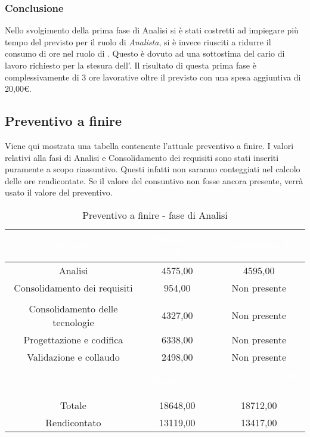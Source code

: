 \subsubsection{Conclusione}
Nello svolgimento della prima fase di Analisi si è stati costretti ad impiegare più tempo del previsto per il ruolo di \textit{Analista}, si è invece riusciti a ridurre il consumo di ore nel ruolo di \textit{\Amministratore}. Questo è dovuto ad una sottostima del cario di lavoro richiesto per la stesura dell'{\AdR}. Il risultato di questa prima fase è complessivamente di 3 ore lavorative oltre il previsto con una spesa aggiuntiva di 20,00€.
\subsection{Preventivo a finire}
Viene qui mostrata una tabella contenente l'attuale preventivo a finire. I valori relativi alla fasi di Analisi e Consolidamento dei requisiti sono stati inseriti puramente a scopo riassuntivo. Questi infatti non saranno conteggiati nel calcolo delle ore rendicontate. Se il valore del consuntivo non fosse ancora presente, verrà usato il valore del preventivo.
\begin{table}[H]
	\centering
	\begin{tabular}{|c|c|c|}
	\rowcolor{darkblue} 
		\textcolor{white}{Periodo}	&\textcolor{white}{Preventivo €}	&	\textcolor{white}{Consuntivo €} \\ \hline
		Analisi					&	4575,00				&	4595,00  \\ \hline
		Consolidamento dei requisiti	&	954,00				&	Non presente  \\ \hline
		\rowcolor{darkblue} \multicolumn{3}{|c|}{\textcolor{white}{Rendicontato}}  \\ \hline
		Consolidamento delle tecnologie	&	4327,00				&	Non presente  \\ \hline
		Progettazione e codifica		&	6338,00				&	Non presente  \\ \hline
		Validazione e collaudo		&	2498,00				&	Non presente  \\ \hline
		\rowcolor{darkblue}		&\textcolor{white}{Preventivo €}	&	\textcolor{white}{Preventivo a finire €} \\ \hline
		Totale					&	18648,00				&	18712,00 \\ \hline
		Rendicontato			&	13119,00				&	13417,00 \\ \hline
	\end{tabular}
	\caption{Preventivo a finire - fase di Analisi}
\end{table}